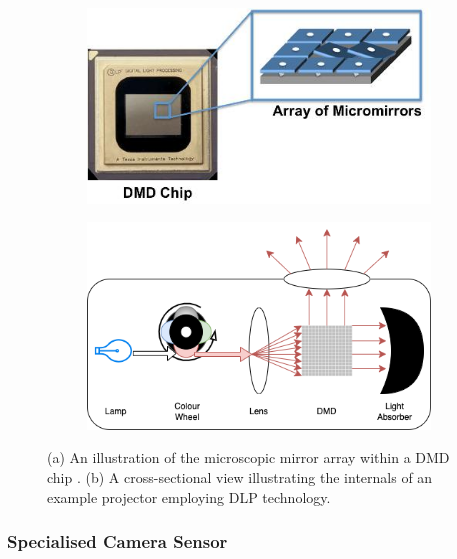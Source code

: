 \begin{figure}[H]
    \centering
    \begin{subfigure}{.4\textwidth}
        \centering
        \includegraphics[width=1\linewidth]{assets/dmd-chip.jpg}
        \caption{}
    \end{subfigure}
    \hfill
    \begin{subfigure}{.49\textwidth}
        \centering
        \includegraphics[width=1\linewidth]{assets/dlp-projector.png}
        \caption{}
    \end{subfigure}
    \caption{(a) An illustration of the microscopic mirror array within a DMD chip \cite{HowDoesDLP}. (b) A cross-sectional view illustrating the internals of an example projector employing DLP technology.}
    \label{fig:dmd_dlp}
\end{figure}

\subsubsection{Specialised Camera Sensor}

